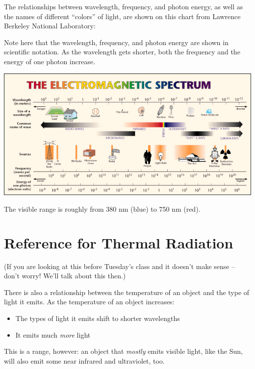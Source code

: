 \documentclass[12pt]{article}
\begin{document}
\Large
\centerline{}
\normalsize



The relationships between wavelength, frequency, and photon energy, as well as the names of different ``colors'' of light, are shown on this chart from Lawrence Berkeley National Laboratory:


	Note here that the wavelength, frequency, and photon energy are shown in scientific notation. As the wavelength gets shorter, both the frequency and the energy of one photon increase.



\begin{center}
	\includegraphics[width=6in]{EMSpec.png}
\end{center}



The visible range is roughly from 380 nm (blue) to 750 nm (red).

\section{Reference for Thermal Radiation}

(If you are looking at this before Tuesday's class and it doesn't make sense -- don't worry! We'll talk about this then.)

There is also a relationship between the temperature of an object and the type of light it emits. As the temperature of an object increases:

\begin{itemize}
	\item The types of light it emits shift to shorter wavelengths
	\item It emits much {\it more} light
\end{itemize}

This is a range, however: an object that {\it mostly} emits visible light, like the Sun, will also emit some near infrared and ultraviolet, too.
\end{document}
